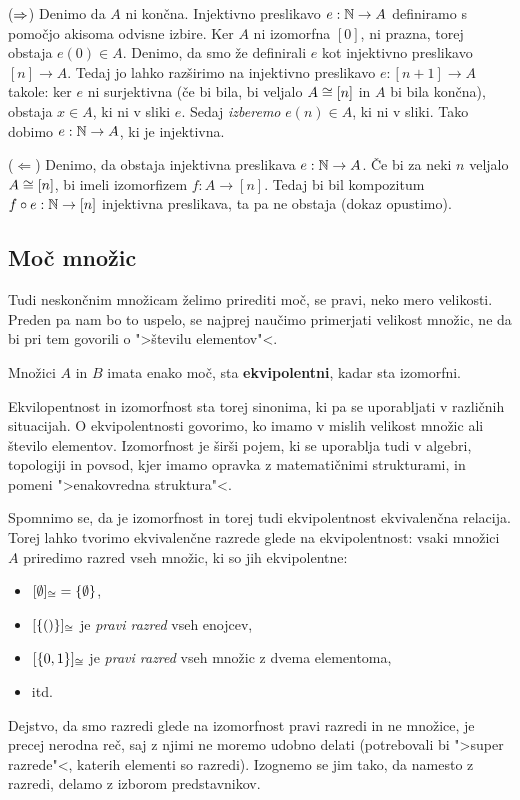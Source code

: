 \begin{dokaz}

($\Rightarrow$)
%
Denimo da $A$ ni končna.
Injektivno preslikavo $e : \mathbb{N} \to A$ definiramo s pomočjo akisoma odvisne izbire.
Ker $A$ ni izomorfna $[0]$, ni prazna, torej obstaja $e(0) \in A$.
Denimo, da smo že definirali $e$ kot injektivno preslikavo $[n] \to A$.
Tedaj jo lahko razširimo na injektivno preslikavo $e : [n+1] \to A$ takole: ker $e$ ni surjektivna (če bi bila, bi veljalo $A \cong [n]$ in $A$ bi bila končna), obstaja $x \in A$, ki ni v sliki $e$.
Sedaj \emph{izberemo} $e(n) \in A$, ki ni v sliki.
Tako dobimo $e : \mathbb{N} \to A$, ki je injektivna.

($\Leftarrow$)
%
Denimo, da obstaja injektivna preslikava $e : \mathbb{N} \to A$.
Če bi za neki $n$ veljalo $A \cong [n]$, bi imeli izomorfizem $f : A \to [n]$.
Tedaj bi bil kompozitum $f \circ e : \mathbb{N} \to [n]$ injektivna preslikava, ta pa ne obstaja (dokaz opustimo).
\end{dokaz}

\subsection{Moč množic}

Tudi neskončnim množicam želimo prirediti moč, se pravi, neko mero velikosti. Preden pa nam bo to uspelo, se najprej naučimo primerjati velikost množic, ne da bi pri tem govorili o ">številu elementov"<.

\begin{definicija}
  Množici $A$ in $B$ imata enako moč, sta \textbf{ekvipolentni}, kadar sta izomorfni.
\end{definicija}

Ekvilopentnost in izomorfnost sta torej sinonima, ki pa se uporabljati v različnih situacijah. O ekvipolentnosti govorimo, ko imamo v mislih velikost množic ali število elementov. Izomorfnost je širši pojem, ki se uporablja tudi v algebri, topologiji in povsod, kjer imamo opravka z matematičnimi strukturami, in pomeni ">enakovredna struktura"<.

Spomnimo se, da je izomorfnost in torej tudi ekvipolentnost ekvivalenčna relacija.
Torej lahko tvorimo ekvivalenčne razrede glede na ekvipolentnost: vsaki množici $A$ priredimo razred vseh množic, ki so jih ekvipolentne:
%
\begin{itemize}
\item $[\emptyset]_{\cong} = \{ \emptyset \}$,
\item $[\left\{ () \right\}]_{\cong}$ je \emph{pravi razred} vseh enojcev,
\item $[\left\{0, 1\right\}]_{\cong}$ je \emph{pravi razred} vseh množic z dvema elementoma,
\item itd.
\end{itemize}
%
Dejstvo, da smo razredi glede na izomorfnost pravi razredi in ne množice, je precej nerodna reč, saj z njimi ne moremo udobno delati (potrebovali bi ">super razrede"<, katerih elementi so razredi).
Izognemo se jim tako, da namesto z razredi, delamo z izborom predstavnikov.


